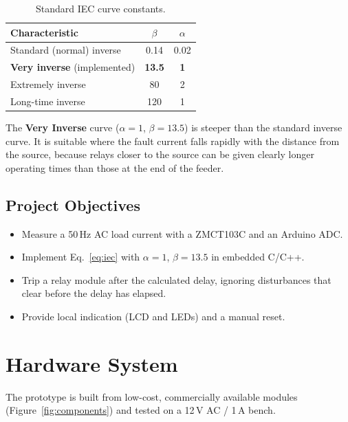 \documentclass[12pt, a4paper]{article}
\begin{document}
\begin{table}[H]
  \centering
  \caption{Standard IEC curve constants.}
  \begin{tabular}{lcc}
    \toprule
    Characteristic & $\beta$ & $\alpha$ \\
    \midrule
    Standard (normal) inverse & 0.14 & 0.02 \\
    \textbf{Very inverse} (implemented) & \textbf{13.5} & \textbf{1} \\
    Extremely inverse & 80 & 2 \\
    Long-time inverse & 120 & 1 \\
    \bottomrule
  \end{tabular}
\end{table}

The \textbf{Very Inverse} curve ($\alpha = 1$, $\beta = 13.5$) is steeper than the standard inverse curve. It is suitable where the fault current falls rapidly with the distance from the source, because relays closer to the source can be given clearly longer operating times than those at the end of the feeder.

\subsection{Project Objectives}
\begin{itemize}[nosep]
  \item Measure a 50\,Hz AC load current with a ZMCT103C and an Arduino ADC.
  \item Implement Eq.~\eqref{eq:iec} with $\alpha = 1$, $\beta = 13.5$ in embedded C/C++.
  \item Trip a relay module after the calculated delay, ignoring disturbances that clear before the delay has elapsed.
  \item Provide local indication (LCD and LEDs) and a manual reset.
\end{itemize}

\newpage

\section{Hardware System}
The prototype is built from low-cost, commercially available modules (Figure~\ref{fig:components}) and tested on a 12\,V AC / 1\,A bench.
\end{document}
